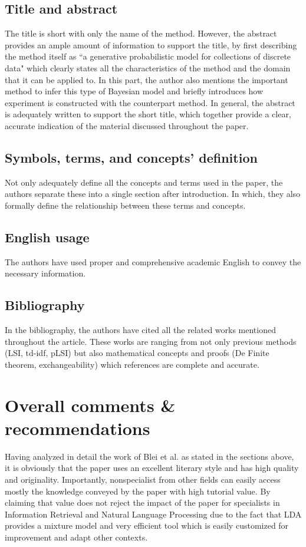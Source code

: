 \documentclass[conference,compsoc]{IEEEtran}
\begin{document}
	\subsection{Title and abstract}
	The title is short with only the name of the method. However, the abstract provides an ample amount of information to support the title, by first describing the method itself as ``a generative probabilistic model for collections of discrete data" \cite{Blei2003} which clearly states all the characteristics of the method and the domain that it can be applied to. In this part, the author also mentions the important method to infer this type of Bayesian model and briefly introduces how experiment is constructed with the counterpart method. In general, the abstract is adequately written to support the short title, which together provide a clear, accurate indication of the material discussed throughout the paper.
	
	\subsection{Symbols, terms, and concepts' definition}
	Not only adequately define all the concepts and terms used in the paper, the authors separate these into a single section after introduction. In which, they also formally define the relationship between these terms and concepts.
	
	\subsection{English usage}
	The authors have used proper and comprehensive academic English to convey the necessary information.
	
	\subsection{Bibliography}
	In the bibliography, the authors have cited all the related works mentioned throughout the article. These works are ranging from not only previous methods (LSI, td-idf, pLSI) but also mathematical concepts and proofs (De Finite theorem, exchangeability) which references are complete and accurate.
	
	\section{Overall comments \& recommendations}
	Having analyzed in detail the work of Blei et al. as stated in the sections above, it is obviously that the paper uses an excellent literary style and has high quality and originality. Importantly, nonspecialist from other fields can easily access mostly the knowledge conveyed by the paper with high tutorial value. By claiming that value does not reject the impact of the paper for specialists in Information Retrieval and Natural Language Processing due to the fact that LDA provides a mixture model and very efficient tool which is easily customized for improvement and adapt other contexts.
	
\end{document}
